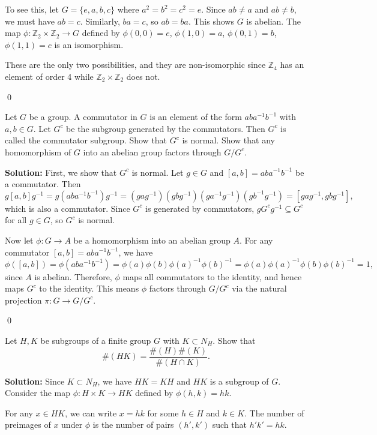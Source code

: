 To see this, let $G = \{e, a, b, c\}$ where $a^2 = b^2 = c^2 = e$. Since $ab \neq a$ and $ab \neq b$, we must have $ab = c$. Similarly, $ba = c$, so $ab = ba$. This shows $G$ is abelian. The map $\phi: \mathbb{Z}_2 \times \mathbb{Z}_2 \to G$ defined by $\phi(0,0) = e$, $\phi(1,0) = a$, $\phi(0,1) = b$, $\phi(1,1) = c$ is an isomorphism.

These are the only two possibilities, and they are non-isomorphic since $\mathbb{Z}_4$ has an element of order 4 while $\mathbb{Z}_2 \times \mathbb{Z}_2$ does not.


\qed
\begin{problembox}
Let $G$ be a group. A commutator in $G$ is an element of the form $aba^{-1}b^{-1}$ with $a, b \in G$. Let $G^c$ be the subgroup generated by the commutators. Then $G^c$ is called the commutator subgroup. Show that $G^c$ is normal. Show that any homomorphism of $G$ into an abelian group factors through $G/G^c$.
\end{problembox}

\noindent\textbf{Solution:} First, we show that $G^c$ is normal. Let $g \in G$ and $[a,b] = aba^{-1}b^{-1}$ be a commutator. Then
\[g[a,b]g^{-1} = g(aba^{-1}b^{-1})g^{-1} = (gag^{-1})(gbg^{-1})(ga^{-1}g^{-1})(gb^{-1}g^{-1}) = [gag^{-1}, gbg^{-1}],\]
which is also a commutator. Since $G^c$ is generated by commutators, $gG^cg^{-1} \subseteq G^c$ for all $g \in G$, so $G^c$ is normal.

Now let $\phi: G \to A$ be a homomorphism into an abelian group $A$. For any commutator $[a,b] = aba^{-1}b^{-1}$, we have
\[\phi([a,b]) = \phi(aba^{-1}b^{-1}) = \phi(a)\phi(b)\phi(a)^{-1}\phi(b)^{-1} = \phi(a)\phi(a)^{-1}\phi(b)\phi(b)^{-1} = 1,\]
since $A$ is abelian. Therefore, $\phi$ maps all commutators to the identity, and hence maps $G^c$ to the identity. This means $\phi$ factors through $G/G^c$ via the natural projection $\pi: G \to G/G^c$.


\qed
\begin{problembox}
Let $H, K$ be subgroups of a finite group $G$ with $K \subset N_H$. Show that
\[\#(HK) = \frac{\#(H)\#(K)}{\#(H \cap K)}.\]
\end{problembox}

\noindent\textbf{Solution:} Since $K \subset N_H$, we have $HK = KH$ and $HK$ is a subgroup of $G$. Consider the map $\phi: H \times K \to HK$ defined by $\phi(h,k) = hk$.

For any $x \in HK$, we can write $x = hk$ for some $h \in H$ and $k \in K$. The number of preimages of $x$ under $\phi$ is the number of pairs $(h',k')$ such that $h'k' = hk$.

